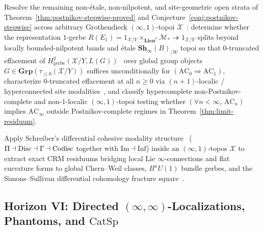 \begin{problem}\label{prob:open-9}
Resolve the remaining non-\'etale, non-nilpotent, and site-geometric open strata of Theorem~\ref{thm:postnikov-stepwise-proved} and Conjecture~\ref{conj:postnikov-stepwise} across arbitrary Grothendieck $(\infty, 1)$-topoi $\mathcal{X}$~\cite{Lurie09}: determine whether the representation $1$-gerbe $R(E_1) = 1_{\mathcal{X}/Y} \times_{\mathbf{Lien}^\kappa} \mathcal{M}_* \twoheadrightarrow 1_{\mathcal{X}/Y}$ splits beyond locally bounded-nilpotent bands and \'etale $\mathbf{Sh}_\infty(B)_{/W}$ topoi so that $0$-truncated effacement of $H^2_{\mathrm{gerbe}}(\mathcal{X}/Y, L(G))$~\cite{Giraud71} over global group objects $G \in \mathbf{Grp}(\tau_{\le 0}(\mathcal{X}/Y))$ suffices unconditionally for $(\mathrm{AC}_0 \Rightarrow \mathrm{AC}_1)$, characterize $0$-truncated effacement at all $n \ge 0$ via $(n+1)$-localic / hyperconnected site modalities~\cite[\S6.4.5]{Lurie09}, and classify hypercomplete non-Postnikov-complete and non-$1$-localic $(\infty, 1)$-topoi testing whether $(\forall n < \infty,\, \mathrm{AC}_n)$ implies $\mathrm{AC}_\infty$ outside Postnikov-complete regimes in Theorem~\ref{thm:limit-residuum}.
\end{problem}

\begin{problem}\label{prob:open-10}
Apply Schreiber's differential cohesive modality structure~\cite{Lawvere07,MoerdijkReyes91,Schreiber13} ($\Pi \dashv \mathrm{Disc} \dashv \Gamma \dashv \mathrm{Codisc}$ together with $\mathrm{Im} \dashv \mathrm{Inf}$) inside an $(\infty, 1)$-topos $\mathcal{X}$ to extract exact CRM residuums bridging local Lie $\infty$-connections and flat curvature forms to global Chern--Weil classes, $B^n U(1)$ bundle gerbes, and the Simons--Sullivan differential cohomology fracture square~\cite{SimonsSullivan08,Schreiber13}.
\end{problem}

\subsection*{Horizon VI: Directed $(\infty, \infty)$-Localizations, Phantoms, and $\mathrm{CatSp}$}

